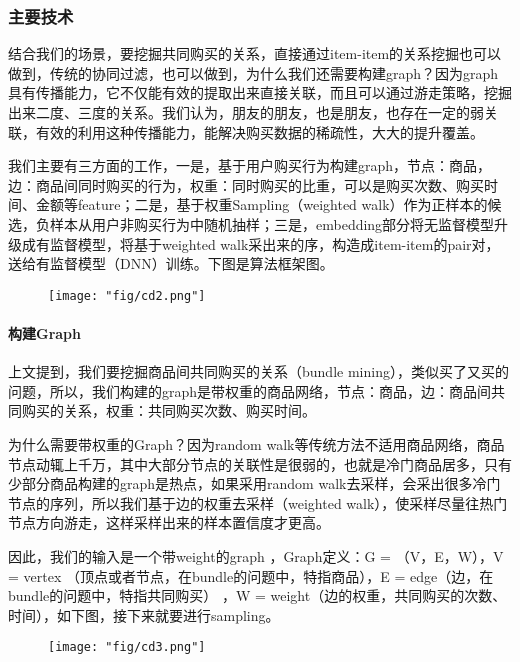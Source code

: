 \subsubsection{主要技术}
结合我们的场景，要挖掘共同购买的关系，直接通过item-item的关系挖掘也可以做到，传统的协同过滤，也可以做到，为什么我们还需要构建graph？因为graph具有传播能力，它不仅能有效的提取出来直接关联，而且可以通过游走策略，挖掘出来二度、三度的关系。我们认为，朋友的朋友，也是朋友，也存在一定的弱关联，有效的利用这种传播能力，能解决购买数据的稀疏性，大大的提升覆盖。
\par 我们主要有三方面的工作，一是，基于用户购买行为构建graph，节点：商品，边：商品间同时购买的行为，权重：同时购买的比重，可以是购买次数、购买时间、金额等feature；二是，基于权重Sampling（weighted walk）作为正样本的候选，负样本从用户非购买行为中随机抽样；三是，embedding部分将无监督模型升级成有监督模型，将基于weighted walk采出来的序，构造成item-item的pair对，送给有监督模型（DNN）训练。下图是算法框架图。

\begin{figure}[!h]
	\centering
	\texttt{[image: "fig/cd2.png"]}
	\caption{}
	\label{fig:cd2}
\end{figure}

\paragraph{构建Graph}
上文提到，我们要挖掘商品间共同购买的关系（bundle mining），类似买了又买的问题，所以，我们构建的graph是带权重的商品网络，节点：商品，边：商品间共同购买的关系，权重：共同购买次数、购买时间。
\par 为什么需要带权重的Graph？因为random walk等传统方法不适用商品网络，商品节点动辄上千万，其中大部分节点的关联性是很弱的，也就是冷门商品居多，只有少部分商品构建的graph是热点，如果采用random walk去采样，会采出很多冷门节点的序列，所以我们基于边的权重去采样（weighted walk），使采样尽量往热门节点方向游走，这样采样出来的样本置信度才更高。
\par 因此，我们的输入是一个带weight的graph ，Graph定义：G = （V，E，W），V = vertex （顶点或者节点，在bundle的问题中，特指商品），E = edge（边，在bundle的问题中，特指共同购买） ，W = weight（边的权重，共同购买的次数、时间），如下图，接下来就要进行sampling。

\begin{figure}[!h]
	\centering
	\texttt{[image: "fig/cd3.png"]}
	\caption{}
	\label{fig:cd3}
\end{figure}

